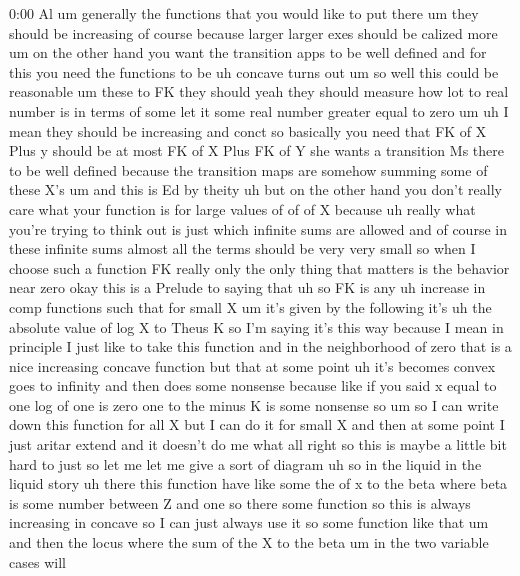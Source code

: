 \begin{unfinished}{0:00}
Al
um  generally  the  functions  that  you
would  like  to  put  there  um  they  should
be  increasing  of  course  because  larger
larger  exes  should  be  calized  more  um  on
the  other  hand  you  want  the  transition
apps  to  be  well  defined  and  for  this  you
need  the  functions  to  be  uh  concave
turns  out  um
so  well  this  could  be
reasonable  um  these  to  FK  they  should
yeah  they  should  measure  how  lot  to  real
number  is  in  terms  of
some  let  it  some  real  number  greater
equal  to  zero
um  uh  I  mean  they  should  be
increasing  and
conct
so  basically  you  need  that  FK  of  X  Plus
y  should  be  at  most  FK  of
X  Plus  FK  of
Y  she  wants  a  transition  Ms  there  to  be
well  defined  because  the  transition  maps
are  somehow  summing  some  of  these  X's  um
and  this  is  Ed  by
theity  uh
but  on  the  other  hand  you  don't  really
care  what  your  function  is  for  large
values  of  of  of  X  because  uh  really  what
you're  trying  to  think  out  is  just  which
infinite  sums  are  allowed  and  of  course
in  these  infinite  sums  almost  all  the
terms  should  be  very  very  small  so  when
I  choose  such  a  function  FK  really  only
the  only  thing  that  matters  is  the
behavior  near
zero
okay  this  is  a  Prelude  to  saying  that  uh
so
FK  is
any  uh  increase  in  comp
functions
such  that  for  small
X  um  it's  given  by  the  following
it's  uh  the  absolute  value  of  log  X  to
Theus
K  so  I'm  saying  it's  this  way  because  I
mean  in  principle  I  just  like  to  take
this  function  and  in  the  neighborhood  of
zero  that  is  a  nice  increasing  concave
function  but  that  at  some  point  uh  it's
becomes  convex  goes  to  infinity  and  then
does  some  nonsense  because  like  if  you
said  x  equal  to  one  log  of  one  is  zero
one  to  the  minus  K  is  some  nonsense  so
um  so  I  can  write  down  this  function  for
all  X  but  I  can  do  it  for  small  X  and
then  at  some  point  I  just  aritar  extend
and  it  doesn't  do
me
what
all  right  so  this  is  maybe  a  little  bit
hard  to  just  so  let  me  let  me  give  a
sort  of
diagram  uh  so  in  the  liquid  in  the
liquid
story  uh  there  this
function  have  like  some  the  of  x  to  the
beta  where  beta  is  some  number  between  Z
and
one  so  there  some  function  so  this  is
always  increasing  in  concave  so  I  can
just  always  use  it  so  some  function  like
that
um  and
then  the  locus  where  the  sum  of  the  X  to
the
beta  um  in  the  two  variable  cases  will

\end{unfinished}
